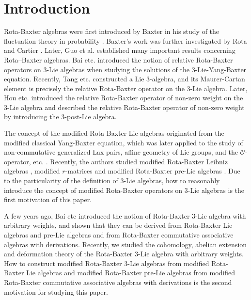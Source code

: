 \documentclass[12pt]{amsart}
\theoremstyle{definition}
\begin{document}


\maketitle

\tableofcontents


\allowdisplaybreaks

\section{Introduction}


Rota-Baxter algebras were first introduced by Baxter in his study of the fluctuation theory in probability \cite{B60}. Baxter's work was further investigated  by Rota \cite{Ro69} and Cartier \cite{C72}.  {Later,   Guo et al. \cite{G00,Gu00, GK00} established many important results concerning Rota–Baxter algebras.}  Bai etc.\cite{BGS19} introduced the notion of relative Rota-Baxter operators  on $3$-Lie algebras when studying the solutions of the $3$-Lie-Yang-Baxter equation. Recently, Tang etc.\cite{THS21} constructed a Lie $3$-algebra, and its Maurer-Cartan element is precisely the relative Rota-Baxter operator on the $3$-Lie algebra.  Later, Hou etc.\cite{HSZ23} introduced the  relative Rota-Baxter operator of non-zero weight on the $3$-Lie algebra and described the  relative Rota-Baxter operator of non-zero weight by introducing the $3$-post-Lie algebra.

The concept of the modified Rota-Baxter Lie algebras \cite{S83} originated from the modified classical Yang-Baxter equation, which was later applied to the study of non-commutative generalized Lax pairs, affine geometry of Lie groups, and the $\mathcal{O}$-operator, etc. \cite{BGN10,B90}. Recently, the authors studied modified Rota-Baxter Leibniz algebras \cite{MS23}, modified $r$-matrices \cite{JS21} and modified Rota-Baxter pre-Lie algebras \cite{GL25}. Due to the particularity of the definition of 3-Lie algebras, how to reasonably introduce the concept of modified Rota-Baxter operators on 3-Lie algebras is {the first motivation of this paper}.

A few years ago, Bai etc \cite{BGLW13} introduced the notion of  Rota-Baxter $3$-Lie algebra with arbitrary weights, and  shown that they can be derived from Rota-Baxter Lie algebras and pre-Lie algebras and from Rota-Baxter commutative associative algebras with derivations.  Recently, we \cite{GQWZ23} studied the cohomology, abelian extension and deformation theory of the Rota-Baxter $3$-Lie algebra with arbitrary weights.  How to construct modified Rota-Baxter 3-Lie algebras from modified Rota-Baxter Lie algebras and {modified Rota-Baxter pre-Lie algebras from modified Rota-Baxter commutative associative algebras with derivations} is the second motivation for studying this paper.
\end{document}

